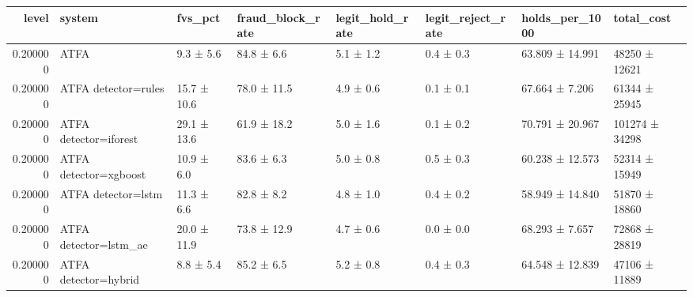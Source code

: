 \begin{tabular}{rlllllll}
\toprule
level & system & fvs\_pct & fraud\_block\_rate & legit\_hold\_rate & legit\_reject\_rate & holds\_per\_1000 & total\_cost \\
\midrule
0.200000 & ATFA & 9.3 ± 5.6 & 84.8 ± 6.6 & 5.1 ± 1.2 & 0.4 ± 0.3 & 63.809 ± 14.991 & 48250 ± 12621 \\
0.200000 & ATFA detector=rules & 15.7 ± 10.6 & 78.0 ± 11.5 & 4.9 ± 0.6 & 0.1 ± 0.1 & 67.664 ± 7.206 & 61344 ± 25945 \\
0.200000 & ATFA detector=iforest & 29.1 ± 13.6 & 61.9 ± 18.2 & 5.0 ± 1.6 & 0.1 ± 0.2 & 70.791 ± 20.967 & 101274 ± 34298 \\
0.200000 & ATFA detector=xgboost & 10.9 ± 6.0 & 83.6 ± 6.3 & 5.0 ± 0.8 & 0.5 ± 0.3 & 60.238 ± 12.573 & 52314 ± 15949 \\
0.200000 & ATFA detector=lstm & 11.3 ± 6.6 & 82.8 ± 8.2 & 4.8 ± 1.0 & 0.4 ± 0.2 & 58.949 ± 14.840 & 51870 ± 18860 \\
0.200000 & ATFA detector=lstm\_ae & 20.0 ± 11.9 & 73.8 ± 12.9 & 4.7 ± 0.6 & 0.0 ± 0.0 & 68.293 ± 7.657 & 72868 ± 28819 \\
0.200000 & ATFA detector=hybrid & 8.8 ± 5.4 & 85.2 ± 6.5 & 5.2 ± 0.8 & 0.4 ± 0.3 & 64.548 ± 12.839 & 47106 ± 11889 \\
\bottomrule
\end{tabular}
